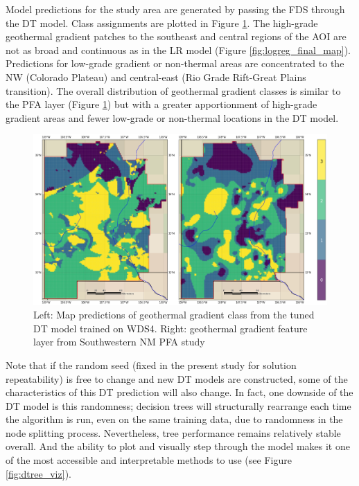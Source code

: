 Model predictions for the study area are generated by passing the FDS through the DT model. Class assignments are plotted in Figure \ref{fig:dtree_final_map}. The high-grade geothermal gradient patches to the southeast and central regions of the AOI are not as broad and continuous as in the LR model (Figure \ref{fig:logreg_final_map}). Predictions for low-grade gradient or non-thermal areas are concentrated to the NW (Colorado Plateau) and central-east (Rio Grade Rift-Great Plains transition). The overall distribution of geothermal gradient classes is similar to the \citet{bielicki_hydrogeolgic_2015} PFA layer (Figure \ref{fig:dtree_final_map}) but with a greater apportionment of high-grade gradient areas and fewer low-grade or non-thermal locations in the DT model.

\begin{figure}
\centering
\includegraphics[width=\textwidth]{templates/images/Figure-DT-FinalMap_Joint.png}
\caption[Decision tree prediction map]{Left: Map predictions of geothermal gradient class from the tuned DT model trained on WDS4. Right: geothermal gradient feature layer from Southwestern NM PFA study \protect\citep{bielicki_hydrogeolgic_2015}}
\label{fig:dtree_final_map}
\end{figure}

Note that if the random seed (fixed in the present study for solution repeatability) is free to change and new DT models are constructed, some of the characteristics of this DT prediction will also change. In fact, one downside of the DT model is this randomness; decision trees will structurally rearrange each time the algorithm is run, even on the same training data, due to randomness in the node splitting process. Nevertheless, tree performance remains relatively stable overall. And the ability to plot and visually step through the model makes it one of the most accessible and interpretable methods to use (see Figure \ref{fig:dtree_viz}).

